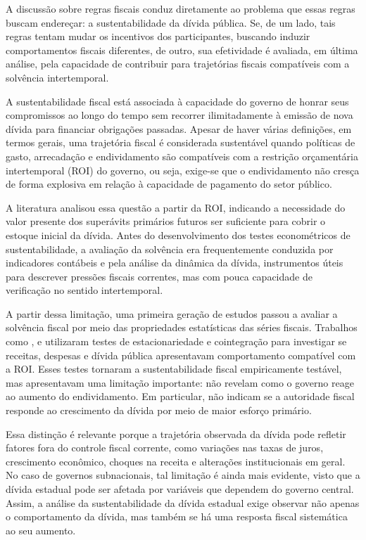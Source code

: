 A discussão sobre regras fiscais conduz diretamente ao problema que essas regras buscam endereçar: a sustentabilidade da dívida pública. Se, de um lado, tais regras tentam mudar os incentivos dos participantes, buscando induzir comportamentos fiscais diferentes, de outro, sua efetividade é avaliada, em última análise, pela capacidade de contribuir para trajetórias fiscais compatíveis com a solvência intertemporal.

A sustentabilidade fiscal está associada à capacidade do governo de honrar seus compromissos ao longo do tempo sem recorrer ilimitadamente à emissão de nova dívida para financiar obrigações passadas. Apesar de haver várias definições, em termos gerais, uma trajetória fiscal é considerada sustentável quando políticas de gasto, arrecadação e endividamento são compatíveis com a restrição orçamentária intertemporal (ROI) do governo, ou seja, exige-se que o endividamento não cresça de forma explosiva em relação à capacidade de pagamento do setor público.

A literatura analisou essa questão a partir da ROI, indicando a necessidade do valor presente dos superávits primários futuros ser suficiente para cobrir o estoque inicial da dívida. Antes do desenvolvimento dos testes econométricos de sustentabilidade, a avaliação da solvência era frequentemente conduzida por indicadores contábeis e pela análise da dinâmica da dívida, instrumentos úteis para descrever pressões fiscais correntes, mas com pouca capacidade de verificação no sentido intertemporal.

A partir dessa limitação, uma primeira geração de estudos passou a avaliar a solvência fiscal por meio das propriedades estatísticas das séries fiscais. Trabalhos como ,  e  utilizaram testes de estacionariedade e cointegração para investigar se receitas, despesas e dívida pública apresentavam comportamento compatível com a ROI. Esses testes tornaram a sustentabilidade fiscal empiricamente testável, mas apresentavam uma limitação importante: não revelam como o governo reage ao aumento do endividamento. Em particular, não indicam se a autoridade fiscal responde ao crescimento da dívida por meio de maior esforço primário.

Essa distinção é relevante porque a trajetória observada da dívida pode refletir fatores fora do controle fiscal corrente, como variações nas taxas de juros, crescimento econômico, choques na receita e alterações institucionais em geral. No caso de governos subnacionais, tal limitação é ainda mais evidente, visto que a dívida estadual pode ser afetada por variáveis que dependem do governo central. Assim, a análise da sustentabilidade da dívida estadual exige observar não apenas o comportamento da dívida, mas também se há uma resposta fiscal sistemática ao seu aumento.

